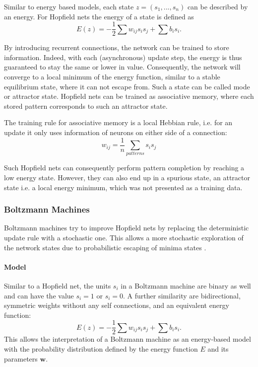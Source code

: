 Similar to energy based models, each state $z = (s_1, ... , s_n)$ can be described by an energy. 
For Hopfield nets the energy of a state is defined as  
\[
E(z) = - \frac{1}{2} \sum w_{ij} s_i s_j + \sum b_i s_i .
\]


By introducing recurrent connections, the network can be trained to store information.
Indeed, with each (asynchronous) update step, the energy is thus guaranteed to stay the same or lower in value.
Consequently, the network will converge to a local minimum of the energy function, similar to a stable equilibrium state, where it can not escape from. 
Such a state can be called mode or attractor state.
Hopfield nets can be trained as associative memory, where each stored pattern corresponds to such an attractor state.

The training rule for associative memory is a local Hebbian rule, i.e. for an update it only uses information of neurons on either side of a connection:
\[
w_{ij} = \frac{1}{n} \sum_{patterns} s_{i} s_{j}
\]

Such Hopfield nets can consequently perform pattern completion by reaching a low energy state.
However, they can also end up in a spurious state, an attractor state i.e. a local energy minimum, which was not presented as a training data.


\subsubsection{Boltzmann Machines} \label{c:bms}

Boltzmann machines try to improve Hopfield nets by replacing the deterministic update rule with a stochastic one.
This allows a more stochastic exploration of the network states due to probabilistic escaping of minima states \cite{ackley1985learning} \cite{Goodfellow-et-al-2016-Book}.

\paragraph{Model} \label{c:bmmodel}

Similar to a Hopfield net, the units $s_i$ in a Boltzmann machine are binary as well and can have the value $s_i = 1$ or $s_i = 0$. 
A further similarity are bidirectional, symmetric weights without any self connections, and an equivalent energy function:
\[
	E(z) = - \frac{1}{2} \sum w_{ij} s_i s_j + \sum b_i s_i .
\]
This allows the interpretation of a Boltzmann machine as an energy-based model with the probability distribution defined by the energy function $E$ and its parameters $\textbf{w}$.

